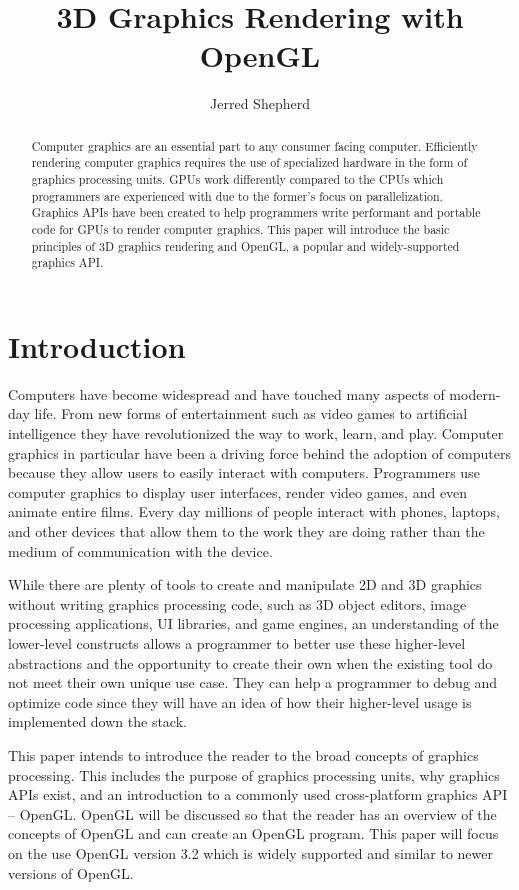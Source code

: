 \documentclass{article}
\title{\Large\textbf{3D Graphics Rendering with OpenGL}}
\author{Jerred Shepherd}
\begin{document}
\begin{titlingpage}
    \maketitle
    \begin{abstract}
    Computer graphics are an essential part to any consumer facing computer. Efficiently rendering computer graphics requires the use of specialized hardware in the form of graphics processing units. GPUs work differently compared to the CPUs which programmers are experienced with due to the former's focus on parallelization. Graphics APIs have been created to help programmers write performant and portable code for GPUs to render computer graphics. This paper will introduce the basic principles of 3D graphics rendering and OpenGL, a popular and widely-supported graphics API.
    \end{abstract}
\end{titlingpage}

\section{Introduction}
Computers have become widespread and have touched many aspects of modern-day life. From new forms of entertainment such as video games to artificial intelligence they have revolutionized the way to work, learn, and play. Computer graphics in particular have been a driving force behind the adoption of computers because they allow users to easily interact with computers. Programmers use computer graphics to display user interfaces, render video games, and even animate entire films. Every day millions of people interact with phones, laptops, and other devices that allow them to the work they are doing rather than the medium of communication with the device.

While there are plenty of tools to create and manipulate 2D and 3D graphics without writing graphics processing code, such as 3D object editors, image processing applications, UI libraries, and game engines, an understanding of the lower-level constructs allows a programmer to better use these higher-level abstractions and the opportunity to create their own when the existing tool do not meet their own unique use case. They can help a programmer to debug and optimize code since they will have an idea of how their higher-level usage is implemented down the stack.

This paper intends to introduce the reader to the broad concepts of graphics processing. This includes the purpose of graphics processing units, why graphics APIs exist, and an introduction to a commonly used cross-platform graphics API -- OpenGL. OpenGL will be discussed so that the reader has an overview of the concepts of OpenGL and can create an OpenGL program. This paper will focus on the use OpenGL version 3.2 which is widely supported and similar to newer versions of OpenGL.
\end{document}
